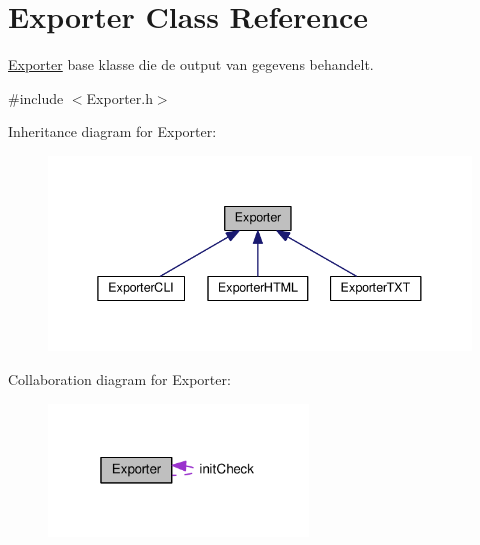 \hypertarget{class_exporter}{}\section{Exporter Class Reference}
\label{class_exporter}


\hyperlink{class_exporter}{Exporter} base klasse die de output van gegevens behandelt.  




{\ttfamily \#include $<$Exporter.\+h$>$}



Inheritance diagram for Exporter\+:
\nopagebreak
\begin{figure}[H]
\begin{center}
\leavevmode
\includegraphics[width=338pt]{class_exporter__inherit__graph}
\end{center}
\end{figure}


Collaboration diagram for Exporter\+:
\nopagebreak
\begin{figure}[H]
\begin{center}
\leavevmode
\includegraphics[width=196pt]{class_exporter__coll__graph}
\end{center}
\end{figure}

